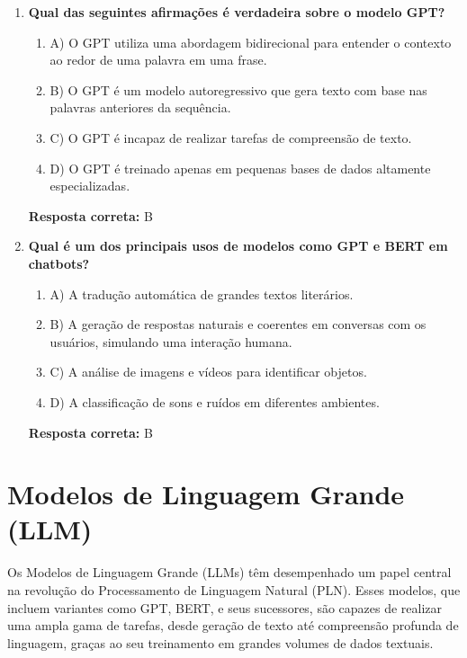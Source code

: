 \documentclass[14pt,a4paper,oneside]{book}
\begin{document}
\begin{enumerate}
	\item \textbf{Qual das seguintes afirmações é verdadeira sobre o modelo GPT?}
	\begin{enumerate}[label=\alph*)]
		\item A) O GPT utiliza uma abordagem bidirecional para entender o contexto ao redor de uma palavra em uma frase.
		\item B) O GPT é um modelo autoregressivo que gera texto com base nas palavras anteriores da sequência.
		\item C) O GPT é incapaz de realizar tarefas de compreensão de texto.
		\item D) O GPT é treinado apenas em pequenas bases de dados altamente especializadas.
	\end{enumerate}
	\vspace{5mm}
	\textbf{Resposta correta:} B
	
	\item \textbf{Qual é um dos principais usos de modelos como GPT e BERT em chatbots?}
	\begin{enumerate}[label=\alph*)]
		\item A) A tradução automática de grandes textos literários.
		\item B) A geração de respostas naturais e coerentes em conversas com os usuários, simulando uma interação humana.
		\item C) A análise de imagens e vídeos para identificar objetos.
		\item D) A classificação de sons e ruídos em diferentes ambientes.
	\end{enumerate}
	\vspace{5mm}
	\textbf{Resposta correta:} B
	
\end{enumerate}



\chapter{Modelos de Linguagem Grande (LLM)}

Os Modelos de Linguagem Grande (LLMs) têm desempenhado um papel central na revolução do Processamento de Linguagem Natural (PLN). Esses modelos, que incluem variantes como GPT, BERT, e seus sucessores, são capazes de realizar uma ampla gama de tarefas, desde geração de texto até compreensão profunda de linguagem, graças ao seu treinamento em grandes volumes de dados textuais.
\end{document}
